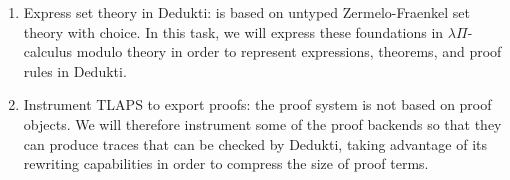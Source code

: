 
\begin{enumerate}
\item Express \tlaplus set theory in Dedukti: \tlaplus is based on untyped
  Zermelo-Fraenkel set theory with choice. In this task, we will express these
  foundations in $\lambda\Pi$-calculus modulo theory in order to represent
  \tlaplus expressions, theorems, and proof rules in Dedukti.
\item Instrument TLAPS to export proofs: the \tlaplus proof system is not based
  on proof objects. We will therefore instrument some of the proof backends so
  that they can produce traces that can be checked by Dedukti, taking advantage
  of its rewriting capabilities in order to compress the size of proof terms.
\end{enumerate}





